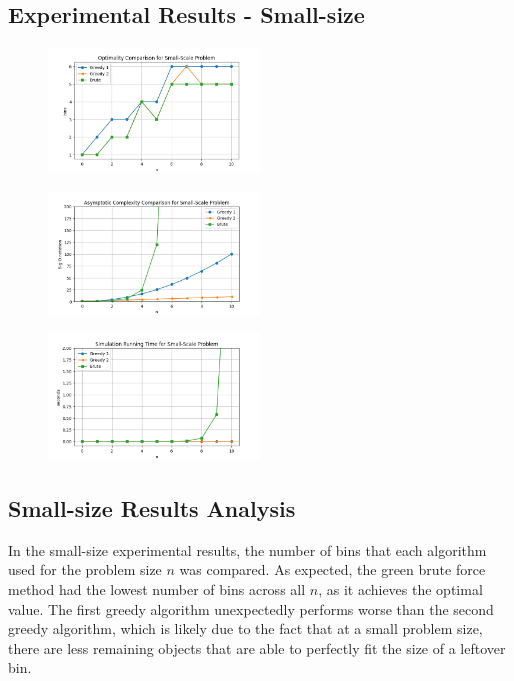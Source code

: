 \documentclass[11pt]{article}
\begin{document}
\subsection{Experimental Results - Small-size}
\begin{figure}[H]
	\centering
	\includegraphics[width=0.5\textwidth]{images/smallscale_optimality.png}
\end{figure}
\begin{figure}[H]
	\centering
	\includegraphics[width=0.5\textwidth]{images/smallscale_complexity.png}
\end{figure}
\begin{figure}[H]
	\centering
	\includegraphics[width=0.5\textwidth]{images/smallscale_simtime.png}
\end{figure}

\subsection{Small-size Results Analysis}
In the small-size experimental results, the number of bins that each algorithm used for the problem
size ${n}$ was compared. As expected, the green brute force method had the lowest number of bins
across all ${n}$, as it achieves the optimal value. The first greedy algorithm unexpectedly performs
worse than the second greedy algorithm, which is likely due to the fact that at a small problem
size, there are less remaining objects that are able to perfectly fit the size of a leftover bin.
\end{document}
